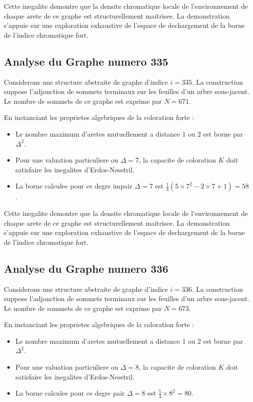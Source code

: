 \documentclass[11pt,a4paper]{article}
\begin{document}
Cette inegalite demontre que la densite chromatique locale de l'environnement de chaque arete de ce graphe est structurellement maitrisee. La demonstration s'appuie sur une exploration exhaustive de l'espace de dechargement de la borne de l'indice chromatique fort.

\subsection{Analyse du Graphe numero 335}
Considerons une structure abstraite de graphe d'indice $i = 335$. La construction suppose l'adjonction de sommets terminaux sur les feuilles d'un arbre sous-jacent. Le nombre de sommets de ce graphe est exprime par $N = 671$.

En instanciant les proprietes algebriques de la coloration forte :
\begin{itemize}
\item Le nombre maximum d'aretes mutuellement a distance $1$ ou $2$ est borne par $\Delta^2$.
\item Pour une valuation particuliere ou $\Delta = 7$, la capacite de coloration $K$ doit satisfaire les inegalites d'Erdos-Nesetril.
\item La borne calculee pour ce degre impair $\Delta = 7$ est $\frac{1}{4}(5 \times 7^2 - 2 \times 7 + 1) = 58$.
\end{itemize}

Cette inegalite demontre que la densite chromatique locale de l'environnement de chaque arete de ce graphe est structurellement maitrisee. La demonstration s'appuie sur une exploration exhaustive de l'espace de dechargement de la borne de l'indice chromatique fort.

\subsection{Analyse du Graphe numero 336}
Considerons une structure abstraite de graphe d'indice $i = 336$. La construction suppose l'adjonction de sommets terminaux sur les feuilles d'un arbre sous-jacent. Le nombre de sommets de ce graphe est exprime par $N = 673$.

En instanciant les proprietes algebriques de la coloration forte :
\begin{itemize}
\item Le nombre maximum d'aretes mutuellement a distance $1$ ou $2$ est borne par $\Delta^2$.
\item Pour une valuation particuliere ou $\Delta = 8$, la capacite de coloration $K$ doit satisfaire les inegalites d'Erdos-Nesetril.
\item La borne calculee pour ce degre pair $\Delta = 8$ est $\frac{5}{4} \times 8^2 = 80$.
\end{itemize}
\end{document}
